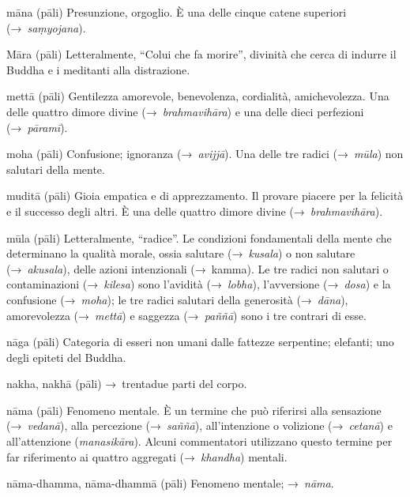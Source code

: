 \begin{glossarydescription}
\item[māna] (pāli) Presunzione, orgoglio. È una delle cinque catene superiori
  (→~\emph{saṃyojana}).

\item[Māra] (pāli) Letteralmente, ``Colui che fa morire'', divinità che cerca di
  indurre il Buddha e i meditanti alla distrazione.

\item[mettā] (pāli) Gentilezza amorevole, benevolenza, cordialità,
  amichevolezza. Una delle quattro dimore divine (→~\emph{brahmavihāra}) e una
  delle dieci perfezioni (→~\emph{pāramī}).

\item[moha] (pāli) Confusione; ignoranza (→~\emph{avijjā}). Una delle tre radici
  (→~\emph{mūla}) non salutari della mente.

\item[muditā] (pāli) Gioia empatica e di apprezzamento. Il provare piacere per
  la felicità e il successo degli altri. È una delle quattro dimore divine
  (→~\emph{brahmavihāra}).

\item[mūla] (pāli) Letteralmente, ``radice''. Le condizioni fondamentali della
  mente che determinano la qualità morale, ossia salutare (→~\emph{kusala}) o
  non salutare (→~\emph{akusala}), delle azioni intenzionali (→~kamma).
  Le tre radici non salutari o contaminazioni (→~\emph{kilesa}) sono l'avidità
  (→~\emph{lobha}), l'avversione (→~\emph{dosa}) e la confusione
  (→~\emph{moha}); le tre radici salutari della generosità (→~\emph{dāna}),
  amorevolezza (→~\emph{mettā}) e saggezza (→~\emph{paññā}) sono i tre contrari
  di esse.


\item[nāga] (pāli) Categoria di esseri non umani dalle fattezze serpentine;
  elefanti; uno degli epiteti del Buddha.

\item[nakha, nakhā] (pāli) →~trentadue parti del corpo.

\item[nāma] (pāli) Fenomeno mentale. È un termine che può riferirsi alla
  sensazione (→~\emph{vedanā}), alla percezione (→~\emph{saññā}), all'intenzione
  o volizione (→~\emph{cetanā}) e all'attenzione (\emph{manasikāra}). Alcuni
  commentatori utilizzano questo termine per far riferimento ai quattro
  aggregati (→~\emph{khandha}) mentali.

\item[nāma-dhamma, nāma-dhammā] (pāli) Fenomeno mentale; →~\emph{nāma}.


\end{glossarydescription}
